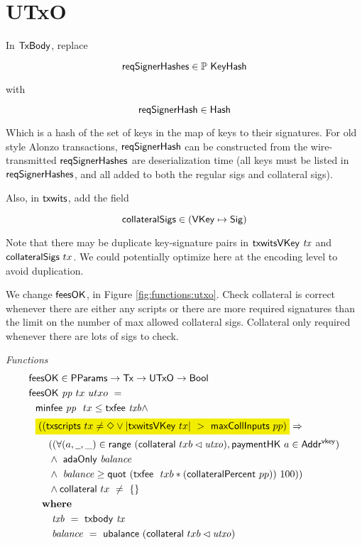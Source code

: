 \section{UTxO}
\label{sec:utxo}

In $\mathsf{TxBody}$, replace

\[\mathsf{reqSignerHashes} \in \mathbb{P}~\mathsf{KeyHash} \]

with

\[ \mathsf{reqSignerHash} \in \mathsf{Hash} \]

Which is a hash of the set of keys in the map of keys to their signatures.
For old style Alonzo transactions,
$\mathsf{reqSignerHash}$ can be constructed from the wire-transmitted $\mathsf{reqSignerHashes}$
are deserialization time (all keys must be listed in $\mathsf{reqSignerHashes}$, and all
added to both the regular sigs and collateral sigs).

Also, in $\mathsf{txwits}$, add the field

\[\mathsf{collateralSigs} \in (\mathsf{VKey} \mapsto \mathsf{Sig})\]

Note that there may be duplicate key-signature pairs in $\mathsf{txwitsVKey}~\mathit{tx}$
and $\mathsf{collateralSigs}~{tx}$. We could potentially optimize here at the
encoding level to avoid duplication.

We change $\mathsf{feesOK}$, in Figure \ref{fig:functions:utxo}.
Check collateral is correct whenever there are either any scripts or there are more
required signatures than the limit on the number of max allowed collateral sigs.
Collateral only required whenever there are lots of sigs to check.

\begin{figure*}[htb]
  \emph{Functions}
  \begin{align*}
    & \fun{feesOK} \in \PParams \to \Tx \to \UTxO \to \Bool  \\
    & \fun{feesOK}~\var{pp}~tx~utxo~= \\
    &~~      \minfee{pp}~{tx} \leq \txfee{txb} \wedge \\
    &~~ \hldiff{((\fun{txscripts}~tx \neq \Nothing \vee \vert\fun{txwitsVKey}~{tx}\vert ~>~ \fun{maxCollInputs}~{pp})} \Rightarrow \\
    &~~~~~~((\forall (a, \wcard, \_) \in \fun{range}~(\fun{collateral}~{txb} \restrictdom \var{utxo}), \fun{paymentHK}~a \in \AddrVKey) \\
    &~~~~~~\wedge~ \fun{adaOnly}~\var{balance} \\
    &~~~~~~\wedge~ \var{balance} \geq \fun{quot}~(\txfee~{txb} * (\fun{collateralPercent}~pp))~100)) \\
    &~~~~~~\wedge \fun{collateral}~{tx}~ \neq~\{\} \\
    &~~      \where \\
    & ~~~~~~~ \var{txb}~=~\txbody{tx} \\
    & ~~~~~~~ \var{balance}~=~\fun{ubalance}~(\fun{collateral}~{txb} \restrictdom \var{utxo})
  \end{align*}
  \caption{Functions related to fees and collateral}
  \label{fig:functions:utxo}
\end{figure*}

